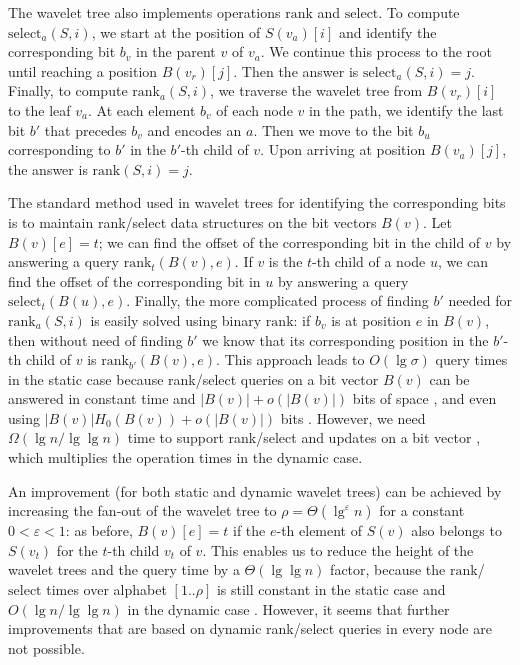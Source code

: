 \documentclass[11pt]{article}
\def\idrm#1{\ensuremath{\mathrm{#1}}}
\newcommand{\ra}{\idrm{rank}}
\newcommand{\sel}{\idrm{select}}
\newcommand{\eps}{\varepsilon}
\begin{document}
The wavelet tree also implements operations $\ra$ and $\sel$.
To compute $\sel_a(S,i)$, we start at the position of $S(v_a)[i]$ and 
identify the corresponding bit $b_v$ in the parent $v$ of $v_a$. We continue
this process to the root until reaching a position $B(v_r)[j]$. Then the answer
is $\sel_a(S,i)=j$.
Finally, to compute $\ra_a(S,i)$, we traverse the wavelet tree from $B(v_r)[i]$
to the leaf $v_a$. At each element $b_v$ of each node $v$ in the path, 
we identify the last bit $b'$ that precedes $b_v$ and encodes an $a$. Then we
move to the bit $b_u$ corresponding to $b'$ in the $b'$-th child of $v$. Upon
arriving at position $B(v_a)[j]$, the answer is $\ra(S,i)=j$.


The standard method used in wavelet trees for identifying
 the corresponding bits 
is to maintain rank/select data structures on the bit vectors $B(v)$. 
Let $B(v)[e]=t$; we can find the offset of the 
corresponding bit in the child of $v$ by answering a query $\ra_t(B(v),e)$.
If $v$ is the $t$-th child of a node $u$, we can find the offset of the
corresponding bit in $u$ by answering a query $\sel_t(B(u),e)$. Finally, the
more complicated process of finding $b'$ needed for $\ra_a(S,i)$ is easily
solved using binary $\ra$: if $b_v$ is at position $e$ in $B(v)$, then without 
need of finding $b'$ we know that its corresponding position in the $b'$-th 
child of $v$ is $\ra_{b'}(B(v),e)$.
This approach leads to $O(\lg\sigma)$ query times in the static case because 
rank/select queries on a bit vector $B(v)$ can be answered in constant time
and $|B(v)|+o(|B(v)|)$ bits of space \cite{Mun96,Cla96}, and even using 
$|B(v)|H_0(B(v))+o(|B(v)|)$ bits \cite{RRR07}. 
However, we need $\Omega(\lg n/\lg \lg n)$ time to support rank/select and
updates on a bit vector \cite{FS89}, which multiplies the operation times in
the dynamic case. 

An improvement (for both static and dynamic wavelet trees) can be achieved by increasing the fan-out of the wavelet tree to $\rho=\Theta(\lg^{\eps} n)$ for a constant $0<\eps<1$: as before, $B(v)[e]=t$ if the $e$-th element
of $S(v)$ also belongs to $S(v_t)$ for the $t$-th child $v_t$ of $v$. 
This enables us to reduce the height of the wavelet trees and the 
query time by a $\Theta(\lg \lg n)$ factor, because the $\ra$/$\sel$ times
over alphabet $[1..\rho]$ is still constant in the static case \cite{FMMN07}
and $O(\lg n /\lg\lg n)$ in the dynamic case \cite{HM10,NS10}. 
However, it seems that further improvements that are based on dynamic rank/select queries 
in every node are not possible.
\end{document}
